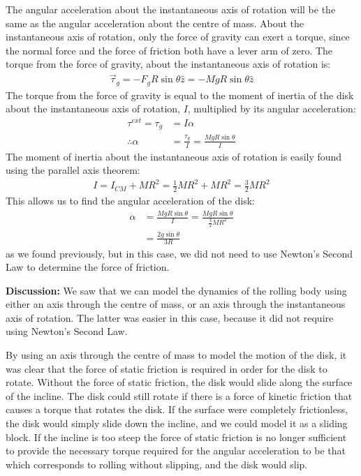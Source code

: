 \begin{example}
The angular acceleration about the instantaneous axis of rotation will be the same as the angular acceleration about the centre of mass. About the instantaneous axis of rotation, only the force of gravity can exert a torque, since the normal force and the force of friction both have a lever arm of zero. The torque from the force of gravity, about the instantaneous axis of rotation is:
\begin{align*}
\vec \tau_g = -F_gR\sin\theta \hat z = -MgR\sin\theta \hat z 
\end{align*}
The torque from the force of gravity is equal to the moment of inertia of the disk about the instantaneous axis of rotation, $I$, multiplied by its angular acceleration:
\begin{align*}
\tau ^{ext} = \tau_g &= I\alpha\\
\therefore \alpha &= \frac{\tau_g}{I} = \frac{MgR\sin\theta}{I}
\end{align*}
The moment of inertia about the instantaneous axis of rotation is easily found using the parallel axis theorem:
\begin{align*}
I = I_{CM}+MR^2 = \frac{1}{2}MR^2 + MR^2 =\frac{3}{2}MR^2
\end{align*}
This allows us to find the angular acceleration of the disk:
\begin{align*}
\alpha &= \frac{MgR\sin\theta}{I} = \frac{MgR\sin\theta}{\frac{3}{2}MR^2}\\
&=\frac{2g\sin\theta}{3R}
\end{align*}
as we found previously, but in this case, we did not need to use Newton's Second Law to determine the force of friction. 

\textbf{Discussion:} We saw that we can model the dynamics of the rolling body using either an axis through the centre of mass, or an axis through the instantaneous axis of rotation. The latter was easier in this case, because it did not require using Newton's Second Law.

By using an axis through the centre of mass to model the motion of the disk, it was clear that the force of static friction is required in order for the disk to rotate. Without the force of static friction, the disk would slide along the surface of the incline. The disk could still rotate if there is a force of kinetic friction that causes a torque that rotates the disk. If the surface were completely frictionless, the disk would simply slide down the incline, and we could model it as a sliding block. If the incline is too steep the force of static friction is no longer sufficient to provide the necessary torque required for the angular acceleration to be that which corresponds to rolling without slipping, and the disk would slip.
\end{example}

